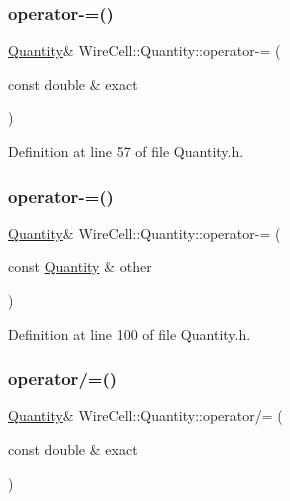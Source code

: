 \subsubsection{\texorpdfstring{operator-\/=()}{operator-=()}\hspace{0.1cm}{\footnotesize\ttfamily [1/2]}}
{\footnotesize\ttfamily \hyperlink{class_wire_cell_1_1_quantity}{Quantity}\& Wire\+Cell\+::\+Quantity\+::operator-\/= (\begin{DoxyParamCaption}\item[{const double \&}]{exact }\end{DoxyParamCaption})\hspace{0.3cm}{\ttfamily [inline]}}



Definition at line 57 of file Quantity.\+h.

\mbox{\label{class_wire_cell_1_1_quantity_abcb48a4701de9b80bbfa4509639f306d}} 
\subsubsection{\texorpdfstring{operator-\/=()}{operator-=()}\hspace{0.1cm}{\footnotesize\ttfamily [2/2]}}
{\footnotesize\ttfamily \hyperlink{class_wire_cell_1_1_quantity}{Quantity}\& Wire\+Cell\+::\+Quantity\+::operator-\/= (\begin{DoxyParamCaption}\item[{const \hyperlink{class_wire_cell_1_1_quantity}{Quantity} \&}]{other }\end{DoxyParamCaption})\hspace{0.3cm}{\ttfamily [inline]}}



Definition at line 100 of file Quantity.\+h.

\mbox{\label{class_wire_cell_1_1_quantity_ade18f30c0a2554d567f6c9ae07fc4e74}} 
\subsubsection{\texorpdfstring{operator/=()}{operator/=()}\hspace{0.1cm}{\footnotesize\ttfamily [1/2]}}
{\footnotesize\ttfamily \hyperlink{class_wire_cell_1_1_quantity}{Quantity}\& Wire\+Cell\+::\+Quantity\+::operator/= (\begin{DoxyParamCaption}\item[{const double \&}]{exact }\end{DoxyParamCaption})\hspace{0.3cm}{\ttfamily [inline]}}



